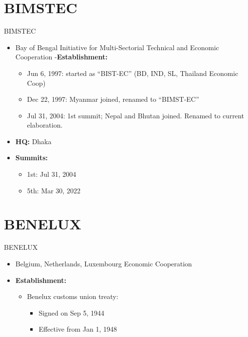 \documentclass[
  12pt,
  ignorenonframetext,
  progressbar=frametitle]{beamer}
\providecommand{\tightlist}{%
  \setlength{\itemsep}{0pt}\setlength{\parskip}{0pt}}
\begin{document}
\section{BIMSTEC}
\begin{frame}[allowframebreaks]
{BIMSTEC}
\protect\hypertarget{bimstec}{}
\begin{itemize}
\tightlist
\item
  Bay of Bengal Initiative for Multi-Sectorial Technical and Economic
  Cooperation -\textbf{Establishment:}

  \begin{itemize}
  \tightlist
  \item
    Jun 6, 1997: started as ``BIST-EC'' (BD, IND, SL, Thailand Economic
    Coop)
  \item
    Dec 22, 1997: Myanmar joined, renamed to ``BIMST-EC''
  \item
    Jul 31, 2004: 1st summit; Nepal and Bhutan joined. Renamed to
    current elaboration.
  \end{itemize}
\item
  \textbf{HQ:} Dhaka
\item
  \textbf{Summits:}

  \begin{itemize}
  \tightlist
  \item
    1st: Jul 31, 2004
  \item
    5th: Mar 30, 2022
  \end{itemize}
\end{itemize}
\end{frame}

\section{BENELUX}
\begin{frame}[allowframebreaks]
{BENELUX}
\protect\hypertarget{benelux}{}
\begin{itemize}
\tightlist
\item
  Belgium, Netherlands, Luxembourg Economic Cooperation
\item
  \textbf{Establishment:}

  \begin{itemize}
  \tightlist
  \item
    Benelux customs union treaty:

    \begin{itemize}
    \tightlist
    \item
      Signed on Sep 5, 1944
    \item
      Effective from Jan 1, 1948
    \end{itemize}
  \end{itemize}
\end{itemize}
\end{frame}
\end{document}
